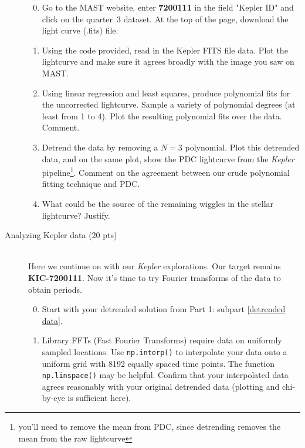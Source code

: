 \begin{description}
 \begin{enumerate}
   \setcounter{enumi}{-1}
   \item Go to the MAST website, enter \textbf{7200111} in the field
     "Kepler ID" and click on the quarter~3 dataset.  At the top of
     the page, download the light curve (.fits) file. 

   \item Using the code provided, read in the Kepler FITS file data.
     Plot the lightcurve and make sure it agrees broadly 
     with the image you saw on MAST.  

    \item Using linear regression and least squares, produce
      polynomial fits for the uncorrected lightcurve.  Sample a
      variety of polynomial degrees (at least from 1 to 4).  Plot the
      resulting polynomial fits over the data.  Comment.

     \item Detrend the data by removing a $N=3$ polynomial.  Plot
       this detrended data, and on the same plot, show the PDC lightcurve from the
       \emph{Kepler} pipeline\footnote{you'll need to
         remove the mean from PDC, since detrending removes the mean
         from the raw lightcurve}.  
       Comment on the agreement between our
       crude polynomial fitting technique and PDC.
       \label{detrended data}

       \item What could be the source of the remaining wiggles in the
         stellar lightcurve?  Justify.

\end{enumerate}
\newpage
  \item[Analyzing Kepler data (20 pts)]~\\
    Here we continue on with our \emph{Kepler} explorations.
    Our target remains \textbf{KIC-7200111}.  Now it's time to try
    Fourier transforms of the data to obtain periods.

\begin{enumerate}
  \setcounter{enumi}{-1}
   \item Start with your detrended solution from Part 1: subpart \ref{detrended data}.

   \item Library FFTs (Fast Fourier Transforms) require data on 
     uniformly sampled locations.
     Use \verb+np.interp()+ to interpolate your data onto a uniform
     grid with 8192 equally spaced time points.  The function
     \verb+np.linspace()+ may be helpful.  Confirm that your
     interpolated data agrees reasonably with your original detrended
     data (plotting and chi-by-eye is sufficient here).


\end{enumerate}
\end{description}
